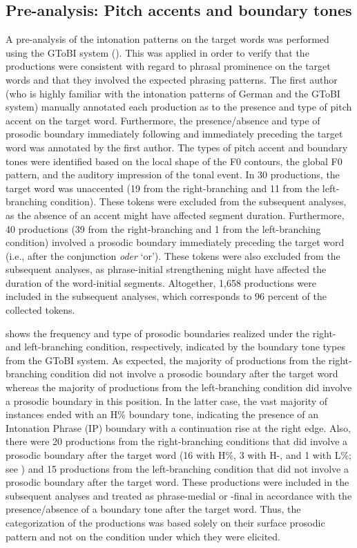 \documentclass[output=paper]{langscibook}
\begin{document}
\subsection{Pre-analysis: Pitch accents and boundary tones}
A pre-analysis of the intonation patterns on the target words was performed using the GToBI system (\citealt{GriceEtal2005}). This was applied in order to verify that the productions were consistent with regard to phrasal prominence on the target words and that they involved the expected phrasing patterns. The first author (who is highly familiar with the intonation patterns of German and the GToBI system) manually annotated each production as to the presence and type of pitch accent on the target word. Furthermore, the presence\slash absence and type of prosodic boundary immediately following and immediately preceding the target word was annotated by the first author. The types of pitch accent and boundary tones were identified based on the local shape of the F0 contours, the global F0 pattern, and the auditory impression of the tonal event. In 30 productions, the target word was unaccented (19 from the right-branching and 11 from the left-branching condition). These tokens were excluded from the subsequent analyses, as the absence of an accent might have affected segment duration. Furthermore, 40 productions (39 from the right-branching and 1 from the left-branching condition) involved a prosodic boundary immediately preceding the target word (i.e., after the conjunction \textit{oder} `or'). These tokens were also excluded from the subsequent analyses, as phrase-initial strengthening might have affected the duration of the word-initial segments. Altogether, 1,658 productions were included in the subsequent analyses, which corresponds to 96 percent of the collected tokens.

 shows the frequency and type of prosodic boundaries realized under the right- and left-branching condition, respectively, indicated by the boundary tone types from the GToBI system. As expected, the majority of productions from the right-branching condition did not involve a prosodic boundary after the target word whereas the majority of productions from the left-branching condition did involve a prosodic boundary in this position. In the latter case, the vast majority of instances ended with an H\% boundary tone, indicating the presence of an Intonation Phrase (IP) boundary with a continuation rise at the right edge. Also, there were 20 productions from the right-branching conditions that did involve a prosodic boundary after the target word (16 with H\%, 3 with H-, and 1 with L\%; see ) and 15 productions from the left-branching condition that did not involve a prosodic boundary after the target word. These productions were included in the subsequent analyses and treated as phrase-medial or -final in accordance with the presence\slash absence of a boundary tone after the target word. Thus, the categorization of the productions was based solely on their surface prosodic pattern and not on the condition under which they were elicited.
\end{document}
